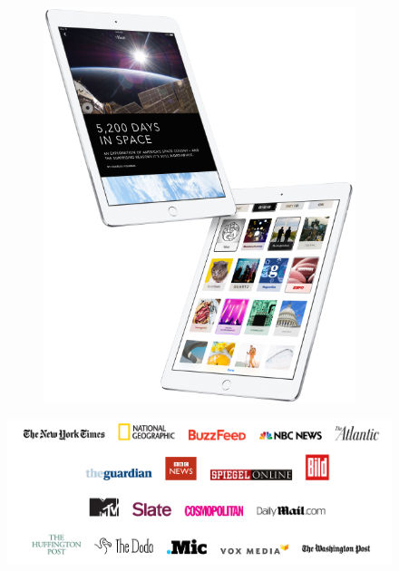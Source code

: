 \documentclass[graphic, aspectratio=169]{beamer}
\begin{document}
\begin{frame}
\begin{figure}
    \begin{subfigure}[b]{0.4\textwidth}
        \includegraphics[width=\textwidth]{images/apple_news_format.png}
        \label{fig:Apple News Format}
    \end{subfigure}

    \end{figure}

\end{frame}

\begin{frame}
    \begin{figure}[h!]
    \centering
    \includegraphics[scale=0.5]{images/FA_supporters.png}
    \label{fig:Facebook Instant Articles}
    \end{figure}
\end{frame}
\end{document}
